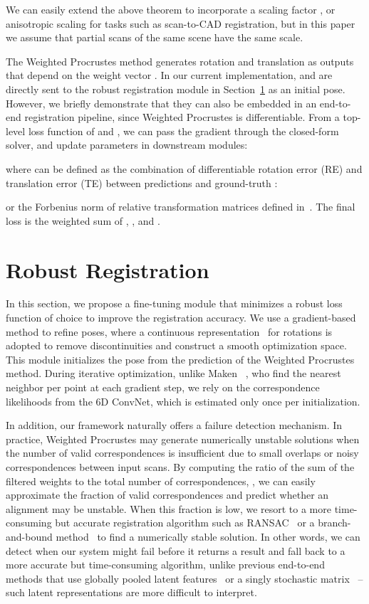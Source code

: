 \documentclass[10pt,twocolumn,letterpaper]{article}
\begin{document}
We can easily extend the above theorem to incorporate a scaling factor , or anisotropic scaling for tasks such as scan-to-CAD registration, but in this paper we assume that partial scans of the same scene have the same scale.



The Weighted Procrustes method generates rotation  and translation  as outputs that depend on the weight vector . 
In our current implementation,  and  are directly sent to the robust registration module in Section~\ref{sec:robust_registration} as an initial pose. 
However, we briefly demonstrate that they can also be embedded in an end-to-end registration pipeline, since Weighted Procrustes is differentiable.
From a top-level loss function  of  and , we can pass the gradient through the closed-form solver, and update parameters in downstream modules:

where  can be defined as the combination of differentiable rotation error (RE) and translation error (TE) between predictions  and ground-truth :

or the Forbenius norm of relative transformation matrices defined in~\cite{aoki2019pointnetlk,wang2019deep}.
The final loss is the weighted sum of , , and . \section{Robust Registration}
\label{sec:robust_registration}
In this section, we propose a fine-tuning module that minimizes a robust loss function of choice to improve the registration accuracy.
We use a gradient-based method to refine poses, where a continuous representation~\cite{zhou2019continuity} for rotations is adopted to remove discontinuities and construct a smooth optimization space.
This module initializes the pose from the prediction of the Weighted Procrustes method.
During iterative optimization, unlike Maken \etal~\cite{maken2019speeding}, who find the nearest neighbor per point at each gradient step, we rely on the correspondence likelihoods from the 6D ConvNet, which is estimated only once per initialization.

In addition, our framework naturally offers a failure detection mechanism. In practice, Weighted Procrustes may generate numerically unstable solutions when the number of valid correspondences is insufficient due to small overlaps or noisy correspondences between input scans. By computing the ratio of the sum of the filtered weights to the total number of correspondences, \ie , we can easily approximate the fraction of valid correspondences and predict whether an alignment may be unstable.
When this fraction is low, we resort to a more time-consuming but accurate registration algorithm such as RANSAC~\cite{schnabel2007efficient,aiger20084pts, rusu2009icra} or a branch-and-bound method~\cite{yang2015go} to find a numerically stable solution.
In other words, we can detect when our system might fail before it returns a result and fall back to a more accurate but time-consuming algorithm, unlike previous end-to-end methods that use globally pooled latent features~\cite{aoki2019pointnetlk} or a singly stochastic matrix~\cite{wang2019deep} -- such latent representations are more difficult to interpret.
\end{document}
